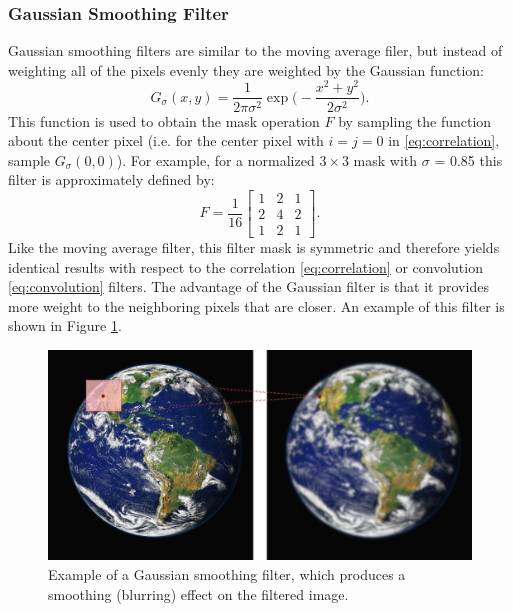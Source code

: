 \subsubsection{Gaussian Smoothing Filter}
Gaussian smoothing filters are similar to the moving average filer, but instead of weighting all of the pixels evenly they are weighted by the Gaussian function:
\begin{equation*}
G_\sigma(x,y) = \frac{1}{2\pi\sigma^2} \exp \bigg(-\frac{x^2 + y^2}{2\sigma^2} \bigg).
\end{equation*}
This function is used to obtain the mask operation $F$ by sampling the function about the center pixel (i.e. for the center pixel with $i=j=0$ in \eqref{eq:correlation}, sample $G_\sigma(0,0)$). For example, for a normalized $3\times3$ mask with $\sigma$ = 0.85 this filter is approximately defined by:
\begin{equation*}
F = \frac{1}{16}
\begin{bmatrix}
1 & 2 & 1\\
2 & 4 & 2\\
1 & 2 & 1
\end{bmatrix}.
\end{equation*}
Like the moving average filter, this filter mask is symmetric and therefore yields identical results with respect to the correlation \eqref{eq:correlation} or convolution \eqref{eq:convolution} filters. The advantage of the Gaussian filter is that it provides more weight to the neighboring pixels that are closer.  An example of this filter is shown in Figure \ref{fig:gaussianfilter}.
\begin{figure}[ht]
  \centering
  \includegraphics[width=.8\textwidth]{tex/figs/ch11_figs/gaussianfilter.png}
    \caption{Example of a Gaussian smoothing filter, which produces a smoothing (blurring) effect on the filtered image.}
    \label{fig:gaussianfilter}
\end{figure}

